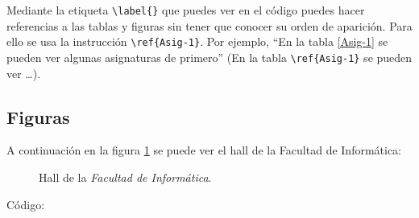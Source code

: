 Mediante la etiqueta \verb+\label{}+ que puedes ver en el código puedes hacer referencias a las tablas y figuras sin tener que conocer su orden de aparición. Para ello se usa la instrucción \verb+\ref{Asig-1}+. Por ejemplo, ``En la tabla \ref{Asig-1} se pueden ver algunas asignaturas de primero'' (En la tabla \verb+\ref{Asig-1}+ se pueden ver \ldots).

\vspace{0.5 cm}

\subsection{Figuras}
\label{subsecc:figuras}

A continuación en la figura \ref{fig:infor-hall} se puede ver el hall de la Facultad de Informática:

\begin{figure}[htbp] 
  \begin{center} 
    \caption{Hall de la \emph{Facultad de Informática}.} 
    \label{fig:infor-hall} 
  \end{center} 
\end{figure}

Código:

\vspace{0.5 cm}

